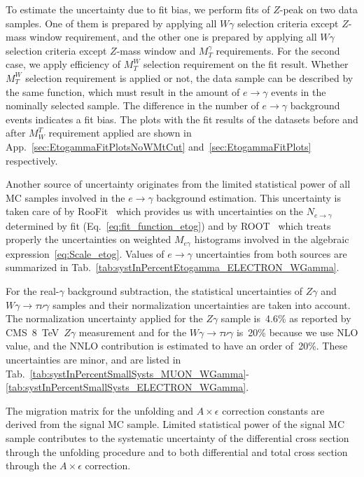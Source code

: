 To estimate the uncertainty due to fit bias, we perform fits of $Z$-peak on two data samples. One of them is prepared by applying all $W\gamma$ selection criteria except $Z$-mass window requirement, and the other one is prepared by applying all $W\gamma$ selection criteria except $Z$-mass window and $M_T^{\gamma}$ requirements. For the second case, we apply efficiency of $M_T^W$ selection requirement on the fit result. Whether $M_T^W$ selection requirement is applied or not, the data sample can be described by the same function, which must result in the amount of $e\rightarrow\gamma$ events in the nominally selected sample. The difference in the number of $e\rightarrow\gamma$ background events indicates a fit bias. The plots with the fit results of the datasets before and after $M_W^T$ requirement applied are shown in App.~\ref{sec:EtogammaFitPlotsNoWMtCut} and~\ref{sec:EtogammaFitPlots} respectively.

Another source of uncertainty originates from the limited statistical power of all MC samples involved in the $e\rightarrow\gamma$ background estimation. This uncertainty is taken care of by RooFit~\cite{ref_RooFit} which provides us with uncertainties on the $N_{e\rightarrow\gamma}$ determined by fit (Eq.~\ref{eq:fit_function_etog}) and by ROOT~\cite{ref_ROOT} which treats properly the uncertainties on weighted $M_{e\gamma}$ histograms involved in the algebraic expression~\ref{eq:Scale_etog}. Values of $e\rightarrow\gamma$ uncertainties from both sources are summarized in Tab.~\ref{tab:systInPercentEtogamma_ELECTRON_WGamma}.


For the real-$\gamma$ background subtraction, the statistical uncertainties of $Z\gamma$ and $W\gamma\rightarrow\tau\nu\gamma$ samples and their normalization uncertainties are taken into account. The normalization uncertainty applied for the $Z\gamma$ sample is~4.6\% as reported by CMS~8~TeV~$Z\gamma$ measurement and for the $W\gamma\rightarrow\tau\nu\gamma$ is~20\% because we use NLO value, and the NNLO contribution is estimated to have an order of~20\%. These uncertainties are minor, and are listed in Tab.~\ref{tab:systInPercentSmallSysts_MUON_WGamma}-\ref{tab:systInPercentSmallSysts_ELECTRON_WGamma}.


The migration matrix for the unfolding and $A\times\epsilon$ correction constants are derived from the signal MC sample. Limited statistical power of the signal MC sample contributes to the systematic uncertainty of the differential cross section through the unfolding procedure and to both differential and total cross section through the  $A\times\epsilon$ correction. 

